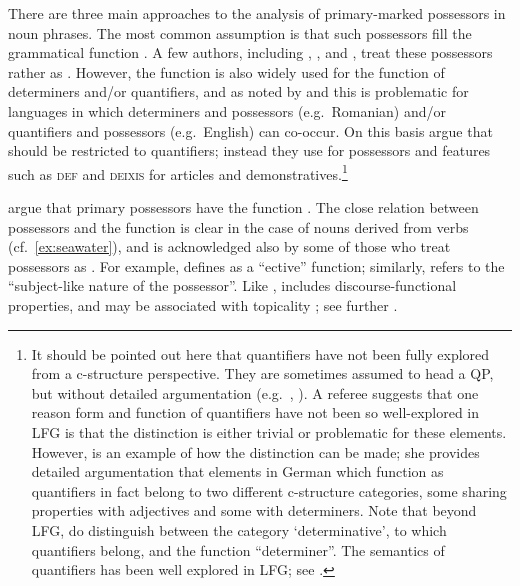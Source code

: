 \documentclass[output=paper,hidelinks]{langscibook}
\begin{document}
There are three main approaches to the analysis of primary-marked possessors in noun phrases. The most common assumption is that such possessors fill the grammatical function {\POSS} \citep[e.g.][]{Rappaport83, Sadler00, falk2001lexical, bresnan2001lexical, BresnanEtAl2016, Laczko00, Laczko07, Laczko17, Strunk05, Charters14, Lowe17, DLM:LFG}. A few authors, including \citet{Williford98}, \citet{ButtEtAl1999}, and \citet{dalrymple01}, treat these possessors rather as {\SPEC}. However, the function {\SPEC} is also widely used for the function of determiners and/or quantifiers, and as noted by \citet{Sadler00} and \citet{Falk02Poss} this is problematic for languages in which determiners and possessors (e.g.\ Romanian) and/or quantifiers and possessors (e.g.\ English) can co-occur. On this basis \citet[83--84]{DLM:LFG} argue that {\SPEC} should be restricted to quantifiers; instead they use {\POSS} for possessors and features such as \textsc{def} and \textsc{deixis} for articles and demonstratives.\footnote{It
    should be pointed out here that quantifiers have not been fully explored from a c-structure perspective. They are sometimes assumed to head a QP, but without detailed argumentation (e.g.\ \citealt{wescoat2007}, \citealt[211--212]{BresnanEtAl2016}). A referee suggests that one reason form and function of quantifiers have not been so well-explored in LFG is that the distinction is either trivial or problematic for these elements. However, \citet{Dipper05} is an example of how the distinction can be made; she provides detailed argumentation that elements in German which function as quantifiers in fact belong to two different c-structure categories, some sharing properties with adjectives and some with determiners. Note that beyond LFG, \citet{PaynHudd02} do distinguish between the category `determinative', to which quantifiers belong, and the function ``determiner''. The semantics of quantifiers has been well explored in LFG; see \citet[302--312]{DLM:LFG}.
}

\citet{ChisaPayn01, ChisaPayn03} argue that primary possessors have the function {\SUBJ}. The close relation between possessors and the {\SUBJ} function is clear in the case of nouns derived from verbs (cf.\ \ref{ex:seawater}), and is acknowledged also by some of those who treat possessors as {\POSS}. For example, \citet[106]{Sadler00} defines {\POSS} as a ``{\SUBJ}ective'' function; similarly, \citet[358]{Laczko07} refers to the ``subject-like nature of the possessor''. Like {\SUBJ}, {\POSS} includes discourse-functional properties, and may be associated with topicality \citep{Rosenbach02}; see further .
\end{document}
